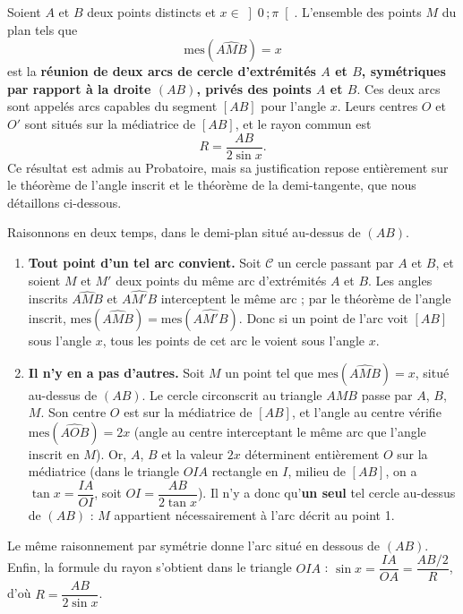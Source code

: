 \documentclass[11pt]{article}
\newcommand{\cle}[1]{{\popxbold\color{popdark}#1}}
\begin{document}
\begin{propriete}
Soient $A$ et $B$ deux points distincts et $x \in \left]0\,;\pi\right[$. L'ensemble des points $M$ du plan tels que
\[
\text{mes}(\widehat{AMB}) = x
\]
est la \textbf{réunion de deux arcs de cercle d'extrémités $A$ et $B$, symétriques par rapport à la droite $(AB)$, privés des points $A$ et $B$}. Ces deux arcs sont appelés \cle{arcs capables} du segment $[AB]$ pour l'angle $x$. Leurs centres $O$ et $O'$ sont situés sur la médiatrice de $[AB]$, et le rayon commun est
\[
R = \frac{AB}{2\sin x}.
\]
Ce résultat est admis au Probatoire, mais sa justification repose entièrement sur le théorème de l'angle inscrit et le théorème de la demi-tangente, que nous détaillons ci-dessous.
\end{propriete}

\begin{experience}
Raisonnons en deux temps, dans le demi-plan situé au-dessus de $(AB)$.
\begin{enumerate}
\item \textbf{Tout point d'un tel arc convient.} Soit $\mathcal{C}$ un cercle passant par $A$ et $B$, et soient $M$ et $M'$ deux points du même arc d'extrémités $A$ et $B$. Les angles inscrits $\widehat{AMB}$ et $\widehat{AM'B}$ interceptent le même arc ; par le théorème de l'angle inscrit, $\text{mes}(\widehat{AMB}) = \text{mes}(\widehat{AM'B})$. Donc si un point de l'arc voit $[AB]$ sous l'angle $x$, tous les points de cet arc le voient sous l'angle $x$.
\item \textbf{Il n'y en a pas d'autres.} Soit $M$ un point tel que $\text{mes}(\widehat{AMB}) = x$, situé au-dessus de $(AB)$. Le cercle circonscrit au triangle $AMB$ passe par $A$, $B$, $M$. Son centre $O$ est sur la médiatrice de $[AB]$, et l'angle au centre vérifie $\text{mes}(\widehat{AOB}) = 2x$ (angle au centre interceptant le même arc que l'angle inscrit en $M$). Or, $A$, $B$ et la valeur $2x$ déterminent entièrement $O$ sur la médiatrice (dans le triangle $OIA$ rectangle en $I$, milieu de $[AB]$, on a $\tan x = \dfrac{IA}{OI}$, soit $OI = \dfrac{AB}{2\tan x}$). Il n'y a donc qu'\textbf{un seul} tel cercle au-dessus de $(AB)$ : $M$ appartient nécessairement à l'arc décrit au point 1.
\end{enumerate}
Le même raisonnement par symétrie donne l'arc situé en dessous de $(AB)$. Enfin, la formule du rayon s'obtient dans le triangle $OIA$ : $\sin x = \dfrac{IA}{OA} = \dfrac{AB/2}{R}$, d'où $R = \dfrac{AB}{2\sin x}$.
\end{experience}
\end{document}
